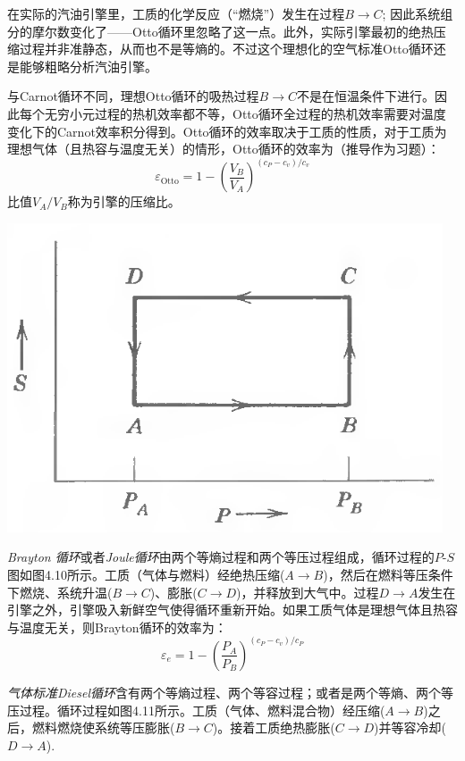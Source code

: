 在实际的汽油引擎里，工质的化学反应（“燃烧”）发生在过程$B \rightarrow C$; 因此系统组分的摩尔数变化了——Otto循环里忽略了这一点。此外，实际引擎最初的绝热压缩过程并非准静态，从而也不是等熵的。不过这个理想化的空气标准Otto循环还是能够粗略分析汽油引擎。

与Carnot循环不同，理想Otto循环的吸热过程$B \rightarrow C$不是在恒温条件下进行。因此每个无穷小元过程的热机效率都不等，Otto循环全过程的热机效率需要对温度变化下的Carnot效率积分得到。Otto循环的效率取决于工质的性质，对于工质为理想气体（且热容与温度无关）的情形，Otto循环的效率为（推导作为习题）：
\begin{equation}
	\varepsilon_{\text{Otto}} = 1 - \left( \frac{V_B}{V_A} \right)^{ (c_P - c_v) / c_v }
\label{equ4.30}
\end{equation}
比值$V_A / V_B$称为引擎的压缩比。

{
	\centering
	\includegraphics[scale=0.7]{Pictures/fig4.10.png}
}

{\it Brayton 循环}或者{\it Joule循环}由两个等熵过程和两个等压过程组成，循环过程的$P \text{-} S$图如图4.10所示。工质（气体与燃料）经绝热压缩($A \rightarrow B$)，然后在燃料等压条件下燃烧、系统升温($B \rightarrow C$)、膨胀($C \rightarrow D$)，并释放到大气中。过程$D \rightarrow A$发生在引擎之外，引擎吸入新鲜空气使得循环重新开始。如果工质气体是理想气体且热容与温度无关，则Brayton循环的效率为：
\begin{equation}
	\varepsilon_e = 1 - \left( \frac{P_A}{P_B} \right)^{(c_P - c_v) / c_P}
\label{equ4.31}
\end{equation}

{\it 气体标准Diesel循环}含有两个等熵过程、两个等容过程；或者是两个等熵、两个等压过程。循环过程如图4.11所示。工质（气体、燃料混合物）经压缩($A \rightarrow B$)之后，燃料燃烧使系统等压膨胀($B \rightarrow C$)。接着工质绝热膨胀($C \rightarrow D$)并等容冷却($D \rightarrow A$).

